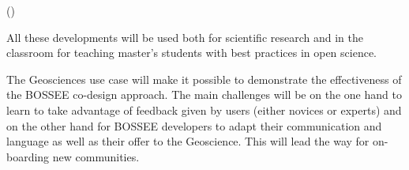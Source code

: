\begin{task}[
  title=Geosciences application,
  id=geoscience,
  lead=UIO,
  PM=24,
  wphases={0-48},
  partners={UIO,QS,SRL}
]
\begin{compactitem}
    ()
  \end{compactitem}

All these developments will be used both for scientific research and in the classroom for teaching master's students with best practices in open science.

The Geosciences use case will make it possible to demonstrate the effectiveness of the BOSSEE co-design approach. The main challenges will 
be on the one hand to learn to take advantage of feedback given by users (either novices or experts) and on the other hand for BOSSEE 
developers to adapt their communication and language as well as their offer to the Geoscience. This will lead the way for on-boarding new 
communities. 
\end{task}
